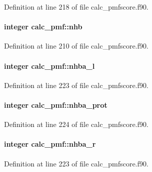 Definition at line 218 of file calc\-\_\-pmfscore.\-f90.

\hypertarget{classcalc__pmf_aaa971de9116dc55c46845c0e34e09384}{
\paragraph[{nhb}]{\setlength{\rightskip}{0pt plus 5cm}integer calc\-\_\-pmf\-::nhb}}\label{classcalc__pmf_aaa971de9116dc55c46845c0e34e09384}


Definition at line 210 of file calc\-\_\-pmfscore.\-f90.

\hypertarget{classcalc__pmf_acb89c2967da4f9c0a217cecc08ccf510}{
\paragraph[{nhba\-\_\-l}]{\setlength{\rightskip}{0pt plus 5cm}integer calc\-\_\-pmf\-::nhba\-\_\-l}}\label{classcalc__pmf_acb89c2967da4f9c0a217cecc08ccf510}


Definition at line 223 of file calc\-\_\-pmfscore.\-f90.

\hypertarget{classcalc__pmf_a8581bffe627bc8ed70f44137b5f42858}{
\paragraph[{nhba\-\_\-prot}]{\setlength{\rightskip}{0pt plus 5cm}integer calc\-\_\-pmf\-::nhba\-\_\-prot}}\label{classcalc__pmf_a8581bffe627bc8ed70f44137b5f42858}


Definition at line 224 of file calc\-\_\-pmfscore.\-f90.

\hypertarget{classcalc__pmf_adca5f880f0ae8019b40b5d900523f009}{
\paragraph[{nhba\-\_\-r}]{\setlength{\rightskip}{0pt plus 5cm}integer calc\-\_\-pmf\-::nhba\-\_\-r}}\label{classcalc__pmf_adca5f880f0ae8019b40b5d900523f009}


Definition at line 223 of file calc\-\_\-pmfscore.\-f90.

